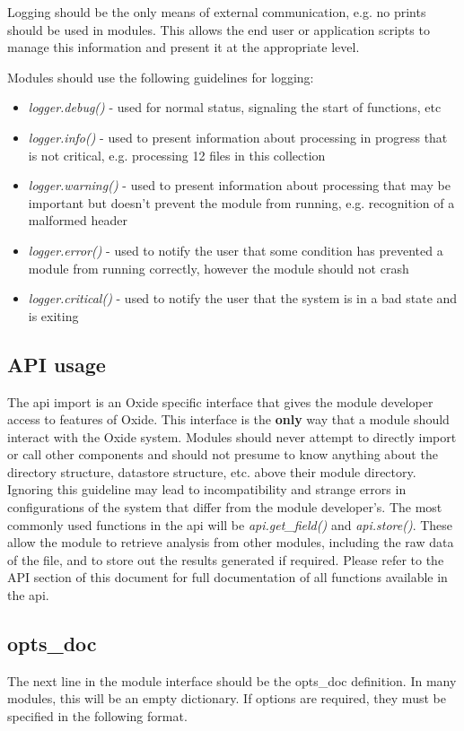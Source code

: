 \documentclass{book}
\begin{document}
Logging should be the only means of external communication, e.g. no prints should be used in modules.  This allows the end user or application scripts to manage this information and present it at the appropriate level.  

Modules should use the following guidelines for logging:

\begin{itemize}
\item \emph{logger.debug()} - used for normal status, signaling the start of functions, etc
\item \emph{logger.info()} - used to present information about processing in progress that is not critical, e.g. processing 12 files in this collection
\item \emph{logger.warning()} - used to present information about processing that may be important but doesn't prevent the module from running, e.g. recognition of a malformed header
\item \emph{logger.error()} - used to notify the user that some condition has prevented a module from running correctly, however the module should not crash
\item \emph{logger.critical()} - used to notify the user that the system is in a bad state and is exiting
\end{itemize}

\subsection{API usage}
The api import is an Oxide specific interface that gives the module developer access to features of Oxide.  This interface is the \textbf{only} way that a module should interact with the Oxide system.  Modules should never attempt to directly import or call other components and should not presume to know anything about the directory structure, datastore structure, etc. above their module directory.  Ignoring this guideline may lead to incompatibility and strange errors in configurations of the system that differ from the module developer's.
The most commonly used functions in the api will be \emph{api.get\_field()} and \emph{api.store()}.  These allow the module to retrieve analysis from other modules, including the raw data of the file, and to store out the results generated if required.  Please refer to the API section of this document for full documentation of all functions available in the api.

\subsection{opts\_doc}
The next line in the module interface should be the opts\_doc definition.  In many modules, this will be an empty dictionary.  If options are required, they must be specified in the following format.
\end{document}

